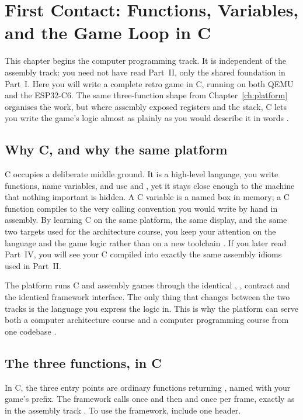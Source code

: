 \chapter{First Contact: Functions, Variables, and the Game Loop in C}
\label{ch:c1}

This chapter begins the computer programming track. It is independent of the
assembly track: you need not have read Part~II, only the shared foundation in
Part~I. Here you will write a complete retro game in C, running on both QEMU and
the ESP32\nobreakdash-C6. The same three-function shape from Chapter~\ref{ch:platform}
organises the work, but where assembly exposed registers and the stack, C lets you
write the game's logic almost as plainly as you would describe it in words
\citep{prg32tutorialc}.

\section{Why C, and why the same platform}

C occupies a deliberate middle ground. It is a high-level language, you write
functions, name variables, and use  and , yet it stays close
enough to the machine that nothing important is hidden. A C variable is a named
box in memory; a C function compiles to the very calling convention you would
write by hand in assembly. By learning C on the same platform, the same display,
and the same two targets used for the architecture course, you keep your attention
on the language and the game logic rather than on a new toolchain
\citep{prg32teaching}. If you later read Part~IV, you will see your C compiled into exactly the same assembly idioms used in Part~II.

\begin{prgconcept}
The platform runs C and assembly games through the identical ,
,  contract and the identical framework interface. The
only thing that changes between the two tracks is the language you express the
logic in. This is why the platform can serve both a computer architecture course
and a computer programming course from one codebase \citep{prg32teaching}.
\end{prgconcept}

\section{The three functions, in C}

In C, the three entry points are ordinary functions returning , named
with your game's prefix. The framework calls  once and then
 and  once per frame, exactly as in the
assembly track \citep{prg32tutorialc}. To use the framework, include one header.


